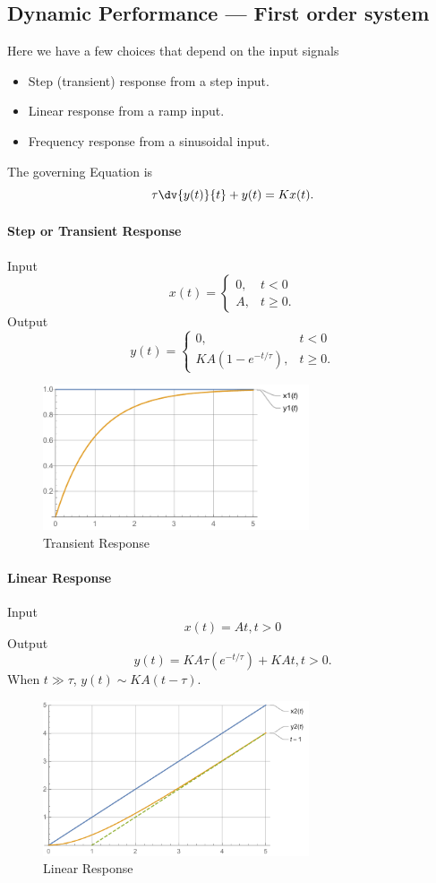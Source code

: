 \documentclass[a4paper,UTF8]{article}
\theoremstyle{mystyle}{
  \newtheorem{law}{Law}
}
\begin{document}
\subsection{Dynamic Performance --- First order system}
Here we have a few choices that depend on the input signals
\begin{itemize}
\item	Step (transient) response from a step input.
\item	Linear response from a ramp input.
\item	Frequency response from a sinusoidal input.
\end{itemize}
The governing Equation is 
\[
\tau \dv{y(t)}{t} +y(t)=K x(t).
\]
\paragraph{Step or Transient Response}
Input 
\[
x(t)=\begin{cases}
0, & t<0\\
A, & t\geq 0.
\end{cases}
\]
Output
\[
y(t)=\begin{cases}
0, & t<0\\
KA(1-e^{-t/\tau}), & t\geq 0.
\end{cases}
\]

\begin{figure}[htbp]
\centering
\caption{Transient Response}
\includegraphics[width=0.7\textwidth]{fig/const_res}
\end{figure}


\paragraph{Linear Response}
Input 
\[
x(t)=At , t>0
\]
Output
\[
y(t)=KA \tau (e^{-t/\tau})+KAt, t>0.
\]
When $t \gg \tau$, $y(t)\sim KA(t-\tau)$.

\begin{figure}[htbp]
\centering
\caption{Linear Response}
\includegraphics[width=0.7\textwidth]{fig/linear_res}
\end{figure}
\end{document}
